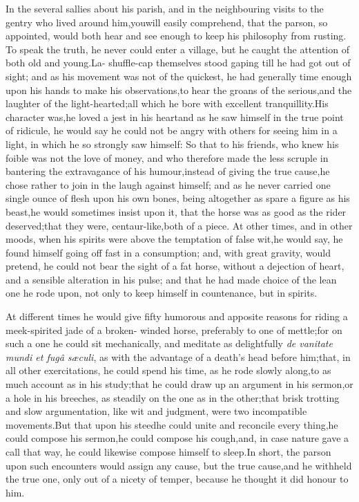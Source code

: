 \documentclass{article}
\begin{document}
In the several sallies about his parish, 
and in the neighbouring visits to the\break
gentry who lived around him,\tsh  you\break will easily
comprehend, that the parson, so appointed, would both hear and see
enough to keep his philosophy from\break
rusting. To speak the truth, he never
could enter a village, but he caught the attention
of both old and young.\tsh  La-\break
{}
\break shuffle-cap themselves
stood gaping till he had got out of sight; and as his\break
movement was
not of the quickest, he had generally time enough upon his\break
hands to make his observations,\tsk  to hear the groans of the
serious,\tsh and the laughter of the light-hearted;\tsk all which he
bore with excellent tranquillity.\tsk  His character was,\tsk  he
loved a jest in his heart\tsk  and as he saw himself in the true
point of ridicule, he would say he could not be angry with others
for seeing him in a light, in which he so strongly saw himself: So
that to his friends, who knew his foible was not the love of money,
and who therefore made the less scruple in bantering the
extravagance of his humour,\tsk  instead of giving the true
cause,\tsk  he chose rather to join in the laugh against himself;
and as he never carried one single ounce of flesh upon his own bones, being altogether
as spare a figure as his beast,\tsk  he would sometimes insist
upon it, that the horse was as good as the rider
deserved;\tsk  that they were, centaur-like,\tsk  both of a
piece. At other times, and in other moods, when his spirits were
above the temptation of false wit,\tsk  he would say, he found
himself going off fast in a consumption; and, with great gravity,
would pretend, he could not bear the sight of a fat horse, without
a dejection of heart, and a sensible alteration in his pulse; and
that he had made choice of the lean one he rode upon, not only to
keep himself in countenance, but in spirits.

At different times he would give fifty humorous and apposite
reasons for riding a meek-spirited jade of a broken-\break 
winded horse,
preferably to one of mettle;\tsk  for on such a one he could sit
mechanically, and meditate as delightfully \textit{de vanitate mundi et
fugâ sæculi}, as with the advantage of a
death’s head before him;\tsk  that, in all other
exercitations, he
could spend his time, as he rode slowly along,\tsk  to as
much account as in his study;\tsk  that he could draw up an
argument in his sermon,\tsk  or a hole in his breeches, as
steadily on the one as in the other;\tsk  that brisk trotting and
slow argumentation, like wit and judgment, were two incompatible
movements.\tsk  But that upon his steed\tsk  he could unite and
reconcile every thing,\tsk  he could compose his sermon,\tsk  he
could compose his cough,\tsh  and, in case nature gave a
call that way, he could likewise compose himself to sleep.\tsk  In
short, the parson upon such encounters would assign any cause, but
the true cause,\tsk  and he with\-held the true one, only out of a
nicety of temper, because he thought it did honour to him.\\
\end{document}

